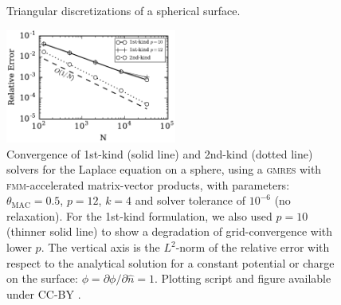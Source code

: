 \documentclass[final,3p,times]{elsarticle}
\newcommand{\fmm}{\textsc{fmm}\xspace}
\newcommand{\gmres}{\textsc{gmres}\xspace}
\newcommand{\partialdi}[2]{\partial #1 / \partial #2}
\newcommand{\nhat}{\hat{n}}
\begin{document}
\begin{figure}%
\begin{center}
	\qquad
	\caption{Triangular discretizations of a spherical surface.}
	\label{fig:glob_spheres}
\end{center}
\end{figure}
%
\begin{figure}[t]
\begin{center}
	\includegraphics[natwidth=3in,natheight=2in,width=0.5\textwidth]{LaplaceConvergence.pdf}
	\caption{Convergence of 1st-kind (solid line) and 2nd-kind (dotted line) solvers for the Laplace equation on a sphere, using a \gmres with \fmm-accelerated matrix-vector products, with parameters: $\theta_{\text{MAC}} = 0.5$, $p=12$, $k=4$ and solver tolerance of $10^{-6}$ (no relaxation). For the 1st-kind formulation, we also used $p=10$ (thinner solid line) to show a degradation of grid-convergence with lower $p$. The vertical axis is the $L^2$-norm of the relative error with respect to the analytical solution for a constant potential or charge on the surface: $\phi = \partialdi{\phi}{\nhat} = 1$. Plotting script and figure available under CC-BY \cite{WangLaytonBarba2016-figshare2}.}
	\label{fig:laplaceconvergence}
\end{center}
\end{figure}
\end{document}
